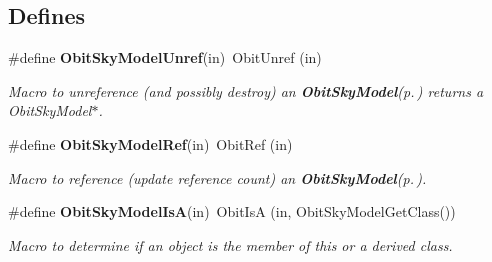 \subsection*{Defines}
\begin{CompactItemize}
\item 
\#define {\bf Obit\-Sky\-Model\-Unref}(in)\ Obit\-Unref (in)
\begin{CompactList}\small\item\em Macro to unreference (and possibly destroy) an {\bf Obit\-Sky\-Model}{\rm (p.\,\pageref{structObitSkyModel})} returns a Obit\-Sky\-Model$\ast$. \item\end{CompactList}\item 
\#define {\bf Obit\-Sky\-Model\-Ref}(in)\ Obit\-Ref (in)
\begin{CompactList}\small\item\em Macro to reference (update reference count) an {\bf Obit\-Sky\-Model}{\rm (p.\,\pageref{structObitSkyModel})}. \item\end{CompactList}\item 
\#define {\bf Obit\-Sky\-Model\-Is\-A}(in)\ Obit\-Is\-A (in, Obit\-Sky\-Model\-Get\-Class())
\begin{CompactList}\small\item\em Macro to determine if an object is the member of this or a derived class. \item\end{CompactList}\end{CompactItemize}
